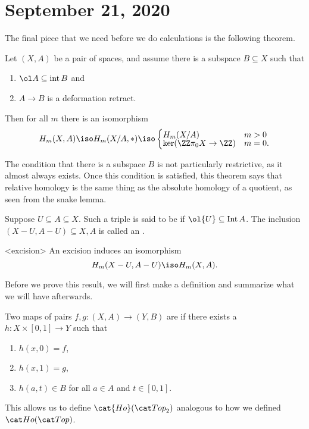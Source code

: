 \documentclass{standalone}
\begin{document}
\chapter{September 21, 2020}

The final piece that we need before we do calculations is
the following theorem.
\begin{theorem}[Excision]
  Let \((X, A)\) be a pair of spaces, and assume there is a subspace
  \(B \subseteq X\) such that
  \begin{enumerate}[nosep]
    \item \(\ol A \subseteq \operatorname{int} B\) and
    \item \(A \to B\) is a deformation retract.
  \end{enumerate}
  Then for all \(m\) there is an isomorphism
  \[
    H_m(X, A) \iso H_m(X/A, *)
      \iso \begin{cases}
        H_m(X/A) & m > 0 \\[-1ex]
        \ker(\ZZ \pi_0 X \to \ZZ) & m = 0.
      \end{cases}
  \]
\end{theorem}
The condition that there is a subspace \(B\) is not particularly restrictive,
as it almost always exists. Once this condition is satisfied, this theorem says
that relative homology is the same thing as the absolute homology of
a quotient, as seen from the snake lemma.

\begin{definition}
  Suppose \(U \subseteq A \subseteq X\). Such a triple is said to be
   if \(\ol{U} \subseteq \Int A\).
  The inclusion \((X - U, A - U) \subseteq X, A\)
  is called an .
\end{definition}
\begin{theorem}<excision>
  An excision induces an isomorphism
  \[
    H_m(X - U, A - U) \iso H_m(X, A).
  \]
\end{theorem}

Before we prove this result, we will first make a definition and summarize
what we will have afterwards.

\begin{definition}
  Two maps of pairs \(f, g \colon (X, A) \to (Y, B)\) are 
  if there exists a \(h \colon X \times [0, 1] \to Y\) such that
  \begin{enumerate}[nosep]
    \item \(h(x, 0) = f\),
    \item \(h(x, 1) = g\),
    \item \(h(a, t) \in B\) for all \(a \in A\) and \(t \in [0, 1]\).
  \end{enumerate}
\end{definition}
This allows us to define \(\cat{Ho}(\cTop_2)\) analogous to how we defined
\(\cHoTop\).
\end{document}

